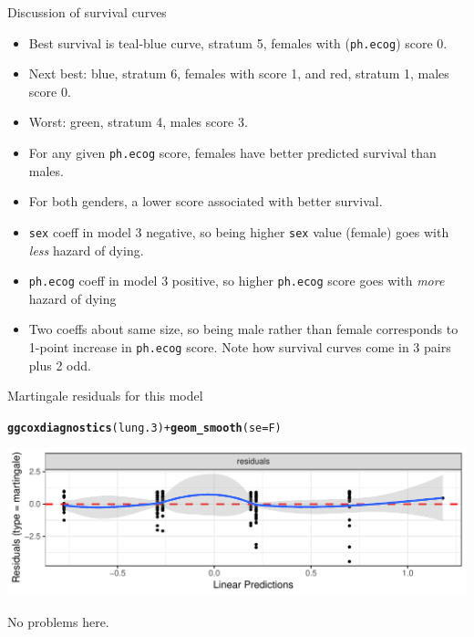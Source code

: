\documentclass[unknownkeysallowed]{beamer}\usepackage[]{graphicx}\usepackage[]{color}
\makeatletter
\def\maxwidth{ %
  \ifdim\Gin@nat@width>\linewidth
    \linewidth
  \else
    \Gin@nat@width
  \fi
}
\newcommand{\hlopt}[1]{\textcolor[rgb]{0,0,0}{#1}}%
\newcommand{\hlstd}[1]{\textcolor[rgb]{0.345,0.345,0.345}{#1}}%
\newcommand{\hlkwc}[1]{\textcolor[rgb]{0.333,0.667,0.333}{#1}}%
\newcommand{\hlkwd}[1]{\textcolor[rgb]{0.737,0.353,0.396}{\textbf{#1}}}%
\newenvironment{kframe}{%
 \def\at@end@of@kframe{}%
 \ifinner\ifhmode%
  \def\at@end@of@kframe{\end{minipage}}%
  \begin{minipage}{\columnwidth}%
 \fi\fi%
 \def\FrameCommand##1{\hskip\@totalleftmargin \hskip-\fboxsep
 \colorbox{shadecolor}{##1}\hskip-\fboxsep
     \hskip-\linewidth \hskip-\@totalleftmargin \hskip\columnwidth}%
 \MakeFramed {\advance\hsize-\width
   \@totalleftmargin\z@ \linewidth\hsize
   \@setminipage}}%
 {\par\unskip\endMakeFramed%
 \at@end@of@kframe}
\newenvironment{knitrout}{}{} %
\makeatother
\begin{document}
\begin{frame}[fragile]{Discussion of survival curves}

  \begin{itemize}
  \item Best survival is teal-blue curve, stratum 5, females with
    (\texttt{ph.ecog}) score 0.
    \item Next best: blue, stratum 6, females with score 1, and
      red, stratum 1, males score 0.
    \item Worst: green, stratum 4, males score 3.
      \item For any given \texttt{ph.ecog} score, females have better
        predicted survival than males.
      \item For both genders, a lower score associated with better
        survival.
  \item \texttt{sex} coeff in model 3 negative, so being higher
    \texttt{sex} value (female) goes with \emph{less} hazard of dying.
  \item \texttt{ph.ecog} coeff in model 3 positive, so higher
    \texttt{ph.ecog} score goes with \emph{more} hazard of dying
  \item Two coeffs about same size, so being male rather than female
    corresponds to 1-point increase in \texttt{ph.ecog} score. Note
    how survival curves come in 3 pairs plus 2 odd.
  \end{itemize}

\end{frame}


\begin{frame}[fragile]{Martingale residuals for this model}
  
\begin{knitrout}
\color{fgcolor}\begin{kframe}
\begin{alltt}
\hlkwd{ggcoxdiagnostics}\hlstd{(lung.3)}\hlopt{+}\hlkwd{geom_smooth}\hlstd{(}\hlkwc{se}\hlstd{=F)}
\end{alltt}


{\ttfamily\noindent\itshape{}}\end{kframe}
\includegraphics[width=\maxwidth]{figure/unnamed-chunk-148-1} 

\end{knitrout}

No problems here.
  
\end{frame}
\end{document}
